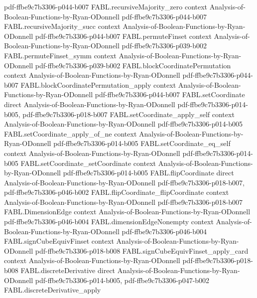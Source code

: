 \begin{theorem}
  {pdf-ffbe9c7b3306-p044-b007}
\proofstep
  {FABL.recursiveMajority_zero}
  {context}
  {Analysis-of-Boolean-Functions-by-Ryan-ODonnell}
  {pdf-ffbe9c7b3306-p044-b007}
\proofstep
  {FABL.recursiveMajority_succ}
  {context}
  {Analysis-of-Boolean-Functions-by-Ryan-ODonnell}
  {pdf-ffbe9c7b3306-p044-b007}
\proofstep
  {FABL.permuteFinset}
  {context}
  {Analysis-of-Boolean-Functions-by-Ryan-ODonnell}
  {pdf-ffbe9c7b3306-p039-b002}
\proofstep
  {FABL.permuteFinset_symm}
  {context}
  {Analysis-of-Boolean-Functions-by-Ryan-ODonnell}
  {pdf-ffbe9c7b3306-p039-b002}
\proofstep
  {FABL.blockCoordinatePermutation}
  {context}
  {Analysis-of-Boolean-Functions-by-Ryan-ODonnell}
  {pdf-ffbe9c7b3306-p044-b007}
\proofstep
  {FABL.blockCoordinatePermutation_apply}
  {context}
  {Analysis-of-Boolean-Functions-by-Ryan-ODonnell}
  {pdf-ffbe9c7b3306-p044-b007}
\proofstep
  {FABL.setCoordinate}
  {direct}
  {Analysis-of-Boolean-Functions-by-Ryan-ODonnell}
  {pdf-ffbe9c7b3306-p014-b005,
    pdf-ffbe9c7b3306-p018-b007}
\proofstep
  {FABL.setCoordinate_apply_self}
  {context}
  {Analysis-of-Boolean-Functions-by-Ryan-ODonnell}
  {pdf-ffbe9c7b3306-p014-b005}
\proofstep
  {FABL.setCoordinate_apply_of_ne}
  {context}
  {Analysis-of-Boolean-Functions-by-Ryan-ODonnell}
  {pdf-ffbe9c7b3306-p014-b005}
\proofstep
  {FABL.setCoordinate_eq_self}
  {context}
  {Analysis-of-Boolean-Functions-by-Ryan-ODonnell}
  {pdf-ffbe9c7b3306-p014-b005}
\proofstep
  {FABL.setCoordinate_setCoordinate}
  {context}
  {Analysis-of-Boolean-Functions-by-Ryan-ODonnell}
  {pdf-ffbe9c7b3306-p014-b005}
\proofstep
  {FABL.flipCoordinate}
  {direct}
  {Analysis-of-Boolean-Functions-by-Ryan-ODonnell}
  {pdf-ffbe9c7b3306-p018-b007,
    pdf-ffbe9c7b3306-p046-b002}
\proofstep
  {FABL.flipCoordinate_flipCoordinate}
  {context}
  {Analysis-of-Boolean-Functions-by-Ryan-ODonnell}
  {pdf-ffbe9c7b3306-p018-b007}
\proofstep
  {FABL.DimensionEdge}
  {context}
  {Analysis-of-Boolean-Functions-by-Ryan-ODonnell}
  {pdf-ffbe9c7b3306-p046-b004}
\proofstep
  {FABL.dimensionEdgeNonempty}
  {context}
  {Analysis-of-Boolean-Functions-by-Ryan-ODonnell}
  {pdf-ffbe9c7b3306-p046-b004}
\proofstep
  {FABL.signCubeEquivFinset}
  {context}
  {Analysis-of-Boolean-Functions-by-Ryan-ODonnell}
  {pdf-ffbe9c7b3306-p018-b008}
\proofstep
  {FABL.signCubeEquivFinset_apply_card}
  {context}
  {Analysis-of-Boolean-Functions-by-Ryan-ODonnell}
  {pdf-ffbe9c7b3306-p018-b008}
\proofstep
  {FABL.discreteDerivative}
  {direct}
  {Analysis-of-Boolean-Functions-by-Ryan-ODonnell}
  {pdf-ffbe9c7b3306-p014-b005,
    pdf-ffbe9c7b3306-p047-b002}
\proofstep
  {FABL.discreteDerivative_apply}

\end{theorem}
